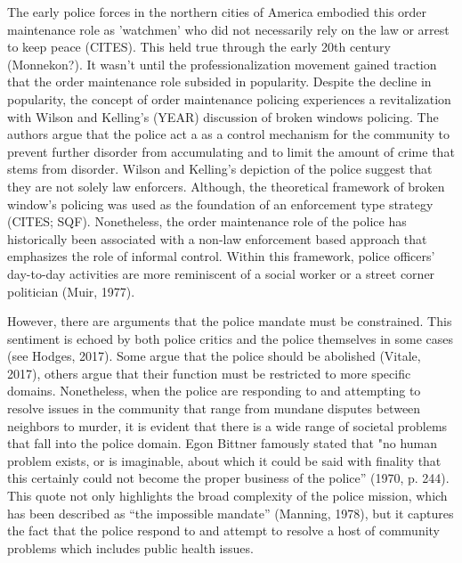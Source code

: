 The early police forces in the northern cities of America embodied this order maintenance role as 'watchmen' who did not necessarily rely on the law or arrest to keep peace (CITES). This held true through the early 20th century (Monnekon?). It wasn't until the professionalization movement gained traction that the order maintenance role subsided in popularity. Despite the decline in popularity, the concept of order maintenance policing experiences a revitalization with Wilson and Kelling's (YEAR) discussion of broken windows policing. The authors argue that the police act a as a control mechanism for the community to prevent further disorder from accumulating and to limit the amount of crime that stems from disorder. Wilson and Kelling's depiction of the police suggest that they are not solely law enforcers. Although, the theoretical framework of broken window's policing was used as the foundation of an enforcement type strategy (CITES; SQF). Nonetheless, the order maintenance role of the police has historically been associated with a non-law enforcement based approach that emphasizes the role of informal control. Within this framework, police officers’ day-to-day activities are more reminiscent of a social worker or a street corner politician (Muir, 1977). 

However, there are arguments that the police mandate must be constrained. This sentiment is echoed by both police critics and the police themselves in some cases (see Hodges, 2017). Some argue that the police should be abolished (Vitale, 2017), others argue that their function must be restricted to more specific domains. Nonetheless, when the police are responding to and attempting to resolve issues in the community that range from mundane disputes between neighbors to murder, it is evident that there is a wide range of societal problems that fall into the police domain. Egon Bittner famously stated that "no human problem exists, or is imaginable, about which it could be said with finality that this certainly could not become the proper business of the police” (1970, p. 244). This quote not only highlights the broad complexity of the police mission, which has been described as “the impossible mandate” (Manning, 1978), but it captures the fact that the police respond to and attempt to resolve a host of community problems which includes public health issues.

